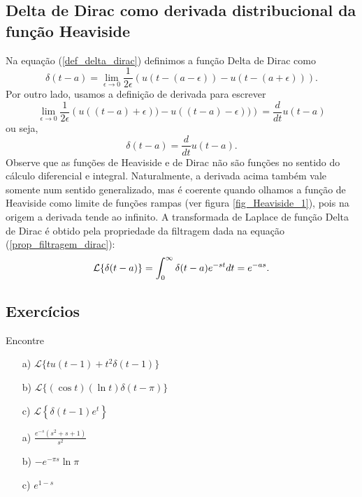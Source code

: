 \subsection{Delta de Dirac como derivada distribucional da função Heaviside}
Na equação (\ref{def_delta_dirac}) definimos a função Delta de Dirac como
\begin{equation}
\delta(t-a)=\lim_{\epsilon\to 0}\frac{1}{2\epsilon}\left(u(t-(a-\epsilon))-u(t-(a+\epsilon))\right).
\end{equation}
Por outro lado, usamos a definição de derivada para escrever
\begin{equation}
\lim_{\epsilon\to 0}\frac{1}{2\epsilon}\left(u((t-a)+\epsilon))-u((t-a)-\epsilon))\right)=\frac{d}{dt}u(t-a)
\end{equation}
ou seja,
\begin{equation}
\delta(t-a)=\frac{d}{dt}u(t-a).
\end{equation}
Observe que as funções de Heaviside e de Dirac não são funções no sentido do cálculo diferencial e integral. Naturalmente, a derivada acima também vale somente num sentido generalizado, mas é coerente quando olhamos a função de Heaviside como limite de funções rampas (ver figura \ref{fig_Heaviside_1}), pois na origem a derivada tende ao infinito.
A transformada de Laplace de função Delta de Dirac é obtido pela propriedade da filtragem dada na equação (\ref{prop_filtragem_dirac}):
\begin{equation}{\label{prop_trans_delta_dirac}}
\mathcal{L}\{\delta(t-a)\}=\int_0^\infty \delta(t-a)e^{-st}dt=e^{-as}.
\end{equation}

\subsection*{Exercícios}%

\begin{exer}
Encontre
\begin{itemize}
  \item[a)] $\displaystyle \mathcal{L} \big\{ t u(t-1) + t^2 \delta(t-1) \big\}$
  \item[b)] $\displaystyle \mathcal{L} \big\{ (\cos t) ( \ln t ) \delta(t-\pi) \big\}$
  \item[c)] $\displaystyle \mathcal{L}\left\{ \delta(t-1) e^t \right\}$
\end{itemize}
\end{exer}
\begin{resp}
\begin{itemize}
  \item[a)] $\displaystyle \frac{ e^{-s} (s^2 + s + 1) }{s^2}$
  \item[b)] $\displaystyle -e^{-\pi s} \ln \pi $
  \item[c)] $\displaystyle e^{1-s}$
  \end{itemize}
\end{resp}

